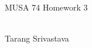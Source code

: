 \documentclass[10pt, twocolumn]{article}
\author{Tarang Srivastava}
\newcommand{\makechaptertitle}[1]{
\begin{center}
	\begin{large}
		#1
	\end{large}
	\begin{small}
		\\Tarang Srivastava
	\end{small}
\end{center}
}
\theoremstyle{definition}
\begin{document}
	
\makechaptertitle{MUSA 74 Homework 3}
\end{document}
